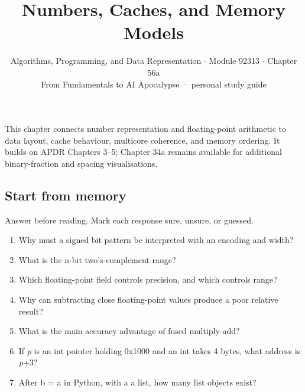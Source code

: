 \documentclass[11pt]{article}
\title{\sffamily\bfseries\color{FAUblue}Numbers, Caches, and Memory Models}
\author{Algorithms, Programming, and Data Representation \ensuremath{\cdot} Module 92313 \ensuremath{\cdot} Chapter 56a\\[2pt]\small From Fundamentals to AI Apocalypse · personal study guide}
\date{}
\begin{document}
\maketitle
\begingroup\footnotesize\setlength{\parskip}{0pt}\tableofcontents\endgroup
\clearpage

{\large This chapter connects number representation and floating-point arithmetic to data layout, cache behaviour, multicore coherence, and memory ordering. It builds on APDR Chapters 3–5; Chapter 34a remains available for additional binary-fraction and spacing visualisations.}


\begin{keepsection}
\section{Start from memory}

Answer before reading. Mark each response sure, unsure, or guessed.

\begin{enumerate}
\item Why must a signed bit pattern be interpreted with an encoding and width?
\item What is the n-bit two’s-complement range?
\item Which floating-point field controls precision, and which controls range?
\item Why can subtracting close floating-point values produce a poor relative result?
\item What is the main accuracy advantage of fused multiply-add?
\item If \textit{p} is an int pointer holding 0x1000 and an int takes 4 bytes, what address is \textit{p}+3?
\item After b = a in Python, with a a list, how many list objects exist?
\end{enumerate}

\end{keepsection}
\end{document}
